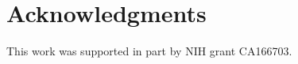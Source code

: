 \documentclass{llncs}
\begin{document}
\section{Acknowledgments}
%
This work was supported in part by NIH grant CA166703.


%
%









\clearpage
{} %
\renewcommand{\indexname}{Author Index}
\printindex
\clearpage

\end{document}
